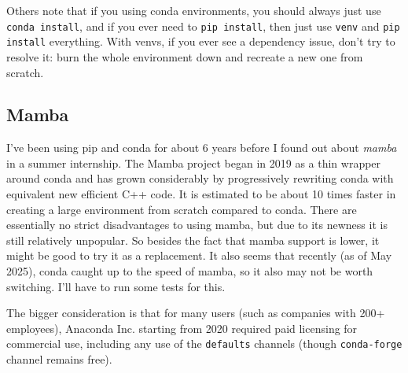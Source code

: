   Others note that if you using conda environments, you should always just use \texttt{conda install}, and if you ever need to \texttt{pip install}, then just use \texttt{venv} and \texttt{pip install} everything. With venvs, if you ever see a dependency issue, don't try to resolve it: burn the whole environment down and recreate a new one from scratch. 

\subsection{Mamba} 

  I've been using pip and conda for about 6 years before I found out about \textit{mamba} in a summer internship. The Mamba project began in 2019 as a thin wrapper around conda and has grown considerably by progressively rewriting conda with equivalent new efficient C++ code. It is estimated to be about 10 times faster in creating a large environment from scratch compared to conda. There are essentially no strict disadvantages to using mamba, but due to its newness it is still relatively unpopular. So besides the fact that mamba support is lower, it might be good to try it as a replacement. It also seems that recently (as of May 2025), conda caught up to the speed of mamba, so it also may not be worth switching. I'll have to run some tests for this. 

  The bigger consideration is that for many users (such as companies with 200+ employees), Anaconda Inc. starting from 2020 required paid licensing for commercial use, including any use of the \texttt{defaults} channels (though \texttt{conda-forge} channel remains free). 

